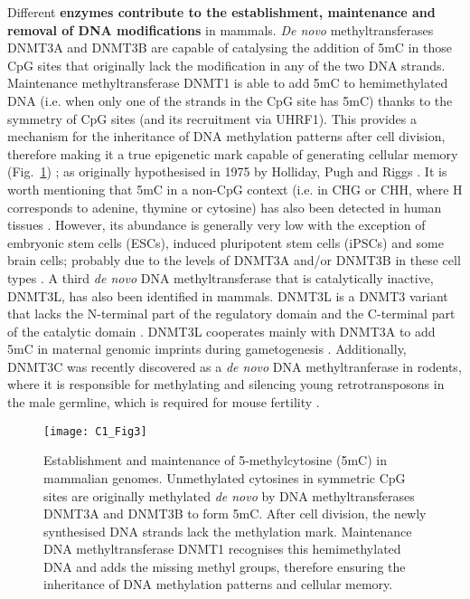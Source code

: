 \bigskip

Different \textbf{enzymes contribute to the establishment, maintenance and removal of DNA modifications} in mammals. \textit{De novo} methyltransferases DNMT3A and DNMT3B are capable of catalysing the addition of 5mC in those CpG sites that originally lack the modification in any of the two DNA strands. Maintenance methyltransferase DNMT1 is able to add 5mC to hemimethylated DNA (i.e. when only one of the strands in the CpG site has 5mC) thanks to the symmetry of CpG sites (and its recruitment via UHRF1). This provides a mechanism for the inheritance of DNA methylation patterns after cell division, therefore making it a true epigenetic mark capable of generating cellular memory (Fig.~\ref{fig:c1_fig3}) \citep{Li2014,Smith2013}; as originally hypothesised in 1975 by Holliday, Pugh and Riggs \citep{Holliday1975,Riggs1975}. It is worth mentioning that 5mC in a non-CpG context (i.e. in \acrshort{CHG} or \acrshort{CHH}, where H corresponds to adenine, thymine or cytosine) has also been detected in human tissues \citep{Schultz2015}. However, its abundance is generally very low with the exception of embryonic stem cells (\acrshort{ESCs}), induced pluripotent stem cells (\acrshort{iPSCs}) and some brain cells; probably due to the levels of DNMT3A and/or DNMT3B in these cell types \citep{Ziller2011,He2015}. A third \textit{de novo} DNA methyltransferase that is catalytically inactive, DNMT3L, has also been identified in mammals. DNMT3L is a DNMT3 variant that lacks the N-terminal part of the regulatory domain and the C-terminal part of the catalytic domain \citep{Lyko2017}. DNMT3L cooperates mainly with DNMT3A to add 5mC in maternal genomic imprints during gametogenesis \citep{Bourchis2001,Tomida2018}. Additionally, DNMT3C was recently discovered as a \textit{de novo} DNA methyltranferase in rodents, where it is responsible for methylating and silencing young retrotransposons in the male germline, which is required for mouse fertility \citep{Barau2016}. 


\begin{figure}[htbp!] 
	\centering    
	\texttt{[image: C1\_Fig3]}
	\vspace*{1 mm}
	\caption[Establishment and maintenance of 5-methylcytosine in mammalian genomes]{Establishment and maintenance of 5-methylcytosine (\acrshort{5mC}) in mammalian genomes. Unmethylated cytosines in symmetric CpG sites are originally methylated \textit{de novo} by DNA methyltransferases DNMT3A and DNMT3B to form \acrshort{5mC}. After cell division, the newly synthesised DNA strands lack the methylation mark. Maintenance DNA methyltransferase DNMT1 recognises this hemimethylated DNA and adds the missing methyl groups, therefore ensuring the inheritance of DNA methylation patterns and cellular memory.}
	\label{fig:c1_fig3}
\end{figure}

